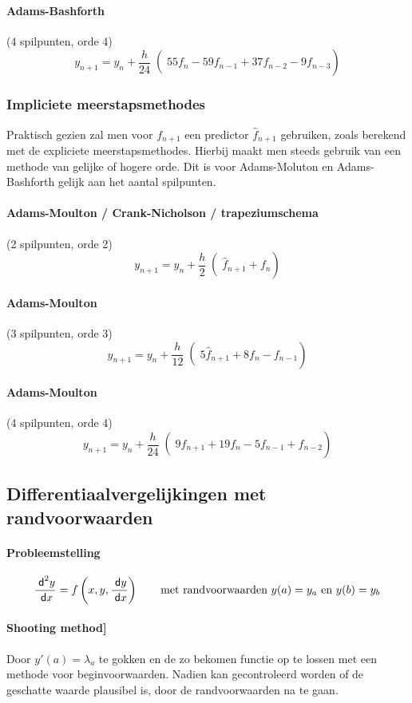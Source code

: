 \paragraph{Adams-Bashforth} (4 spilpunten, orde 4)
\[
  y_{n+1} = y_n + \left.\left. \frac{h}{24} \right( 55f_n - 59f_{n-1} + 37f_{n-2} - 9f_{n-3}\right)
\]

\subsubsection{Impliciete meerstapsmethodes}
Praktisch gezien zal men voor $f_{n+1}$ een predictor $\hat{f}_{n+1}$ gebruiken, zoals berekend met de expliciete meerstapsmethodes. Hierbij maakt men steeds gebruik van een methode van gelijke of hogere orde. Dit is voor Adams-Moluton en Adams-Bashforth gelijk aan het aantal spilpunten.

\paragraph{Adams-Moulton / Crank-Nicholson / trapeziumschema} (2 spilpunten, orde 2)
\[
  y_{n+1} = y_n + \left.\left. \frac{h}{2} \right( \hat{f}_{n+1} + f_n\right)
\]

\paragraph{Adams-Moulton} (3 spilpunten, orde 3)
\[
  y_{n+1} = y_n + \left.\left. \frac{h}{12} \right( 5 \hat{f}_{n+1} + 8f_n -f_{n-1}\right)
\]

\paragraph{Adams-Moulton} (4 spilpunten, orde 4)
\[
  y_{n+1} = y_n + \left.\left. \frac{h}{24} \right( 9 \hat{f}_{n+1} + 19f_n -5f_{n-1} + f_{n-2}\right)
\]

\subsection{Differentiaalvergelijkingen met randvoorwaarden}
\paragraph{Probleemstelling}
\[
  \frac{\;\textsf{d}^2{y}}{\;\textsf{d}x} = f\left(x,y, \frac{\;\textsf{d}y}{\;\textsf{d}x} \right)
  \qquad
  \mbox{met randvoorwaarden $y(a) = y_a$ en $y(b) = y_b$}
\]

\paragraph{Shooting method]}Door $y'(a) = \lambda_a$ te gokken en de zo bekomen functie op te lossen met een methode voor beginvoorwaarden. Nadien kan gecontroleerd worden of de geschatte waarde plausibel is, door de randvoorwaarden na te gaan.

